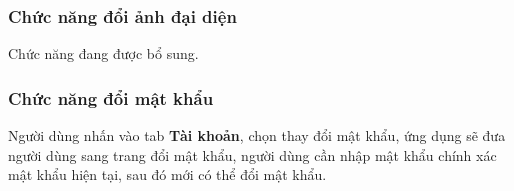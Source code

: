 \subsubsection{Chức năng đổi ảnh đại diện}
Chức năng đang được bổ sung.
\subsubsection{Chức năng đổi mật khẩu}
Người dùng nhấn vào tab \textbf{Tài khoản}, chọn thay đổi mật khẩu, ứng dụng sẽ đưa người dùng sang trang đổi mật khẩu, người dùng cần nhập mật khẩu chính xác mật khẩu hiện tại, sau đó mới có thể đổi mật khẩu.
\begin{figure}[H]
  \centering
  \hfill

\end{figure}
